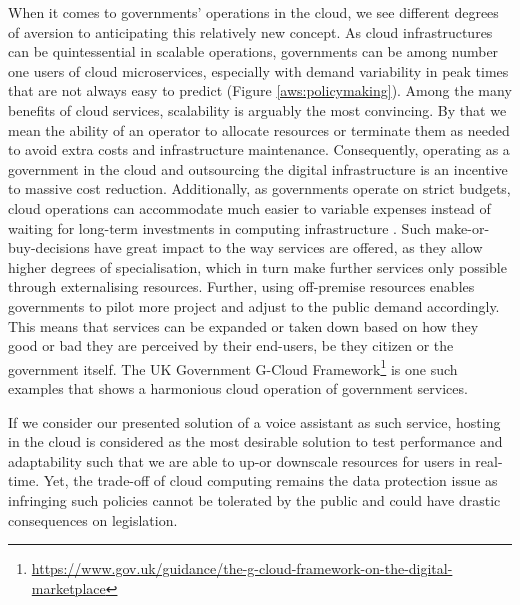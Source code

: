 When it comes to governments' operations in the cloud, we see different degrees of aversion to anticipating this relatively new concept. As cloud infrastructures can be quintessential in scalable operations, governments can be among number one users of cloud microservices, especially with demand variability in peak times that are not always easy to predict (Figure \ref{aws:policymaking}). Among the many benefits of cloud services, scalability is arguably the most convincing. By that we mean the ability of an operator to allocate resources or terminate them as needed to avoid extra costs and infrastructure maintenance.
Consequently, operating as a government in the cloud and outsourcing the digital infrastructure is an incentive to massive cost reduction. Additionally, as governments operate on strict budgets, cloud operations can accommodate much easier to variable expenses instead of waiting for long-term investments in computing infrastructure \cite{aws:pubsecsum}. Such make-or-buy-decisions have great impact to the way services are offered, as they allow higher degrees of specialisation, which in turn make further services only possible through externalising resources.
Further, using off-premise resources enables governments to pilot more project and adjust to the public demand accordingly. This means that services can be expanded or taken down based on how they good or bad they are perceived by their end-users, be they citizen or the government itself.
The UK Government G-Cloud Framework\footnote{\url{https://www.gov.uk/guidance/the-g-cloud-framework-on-the-digital-marketplace}} is one such examples that shows a harmonious cloud operation of government services.

If we consider our presented solution of a voice assistant as such service, hosting in the cloud is considered as the most desirable solution to test performance and adaptability such that we are able to up-or downscale resources for users in real-time. Yet, the trade-off of cloud computing remains the data protection issue as infringing such policies cannot be tolerated by the public and could have drastic consequences on legislation.

